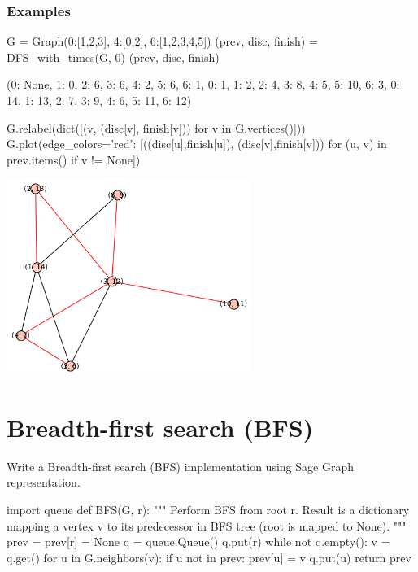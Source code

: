 \subsubsection*{Examples}

\begin{sageCell}
   G = Graph({0:[1,2,3], 4:[0,2], 6:[1,2,3,4,5]})
   (prev, disc, finish) = DFS_with_times(G, 0)
   (prev, disc, finish)
\end{sageCell}
\begin{outCell}
   ({0: None, 1: 0, 2: 6, 3: 6, 4: 2, 5: 6, 6: 1},
    {0: 1, 1: 2, 2: 4, 3: 8, 4: 5, 5: 10, 6: 3},
    {0: 14, 1: 13, 2: 7, 3: 9, 4: 6, 5: 11, 6: 12})
\end{outCell}

\begin{sageCell}
    G.relabel(dict([(v, (disc[v], finish[v])) for v in G.vertices()]))
    G.plot(edge_colors={'red': [((disc[u],finish[u]), (disc[v],finish[v]))
      for (u, v) in prev.items() if v != None]})
\end{sageCell}
\begin{outImage}
   \includegraphics[width=0.6\textwidth]{Images/DFS/dfs_tree_with_times.png}
\end{outImage}

\section{Breadth-first search (BFS)}

Write a Breadth-first search (BFS) implementation using Sage Graph representation.

\medskip
\begin{sageCell}
import queue
def BFS(G, r):
    """
    Perform BFS from root r. Result is a dictionary mapping a vertex v
    to its predecessor in BFS tree (root is mapped to None).
    """
    prev = {}
    prev[r] = None
    q = queue.Queue()
    q.put(r)
    while not q.empty():
        v = q.get()
        for u in G.neighbors(v):
            if u not in prev:
                prev[u] = v
                q.put(u)
    return prev
\end{sageCell}

